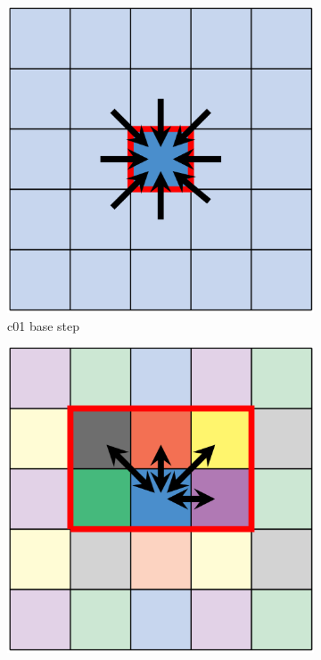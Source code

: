 \begin{figure}[htbp]
    \centering
    \begin{subfigure}[b]{0.3\textwidth}
        \centering
        \includegraphics[width=\linewidth]{imgs/c01.png}
        \caption{\scriptsize c01 base step}
        \label{fig:c01}
    \end{subfigure}
    \begin{subfigure}[b]{0.3\textwidth}
        \centering
        \includegraphics[width=\linewidth]{imgs/c18.png}

\end{subfigure}
\end{figure}
